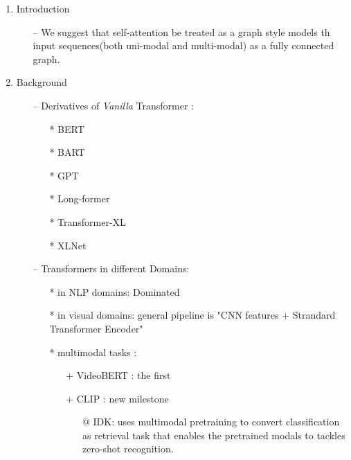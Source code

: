 \documentclass{article}
\begin{document}
	\begin{enumerate}
		\item Introduction
			\begin{itemize}
				\item[--] We suggest that self-attention be treated as a graph style models th input sequences(both uni-modal and multi-modal) as a fully connected graph.
			\end{itemize}

		\item Background
		\begin{itemize}
			\item[--] Derivatives of \textit{Vanilla} Transformer :
				\begin{itemize}
					\item[*] BERT \cite{bert}
					\item[*] BART \cite{BART}
					\item[*] GPT \cite{gpt}
					\item[*] Long-former \cite{Longformer}
					\item[*] Transformer-XL \cite{Transformer-XL}
					\item[*] XLNet \cite{XLNet}
				\end{itemize}
			\item[--] Transformers in different Domains:
				\begin{itemize}
					\item[*] in NLP domains: Dominated
					\item[*] in visual domains: general pipeline is "CNN features + Strandard Transformer Encoder" 
					\item[*] multimodal tasks :
						\begin{itemize}
							\item[+] VideoBERT : the first
							\item[+] CLIP : new milestone 
							\begin{itemize}
								\item[@] IDK: uses multimodal pretraining to convert classification as retrieval task that enables the pretrained modals to tackles zero-shot recognition.
							\end{itemize}
							

\end{itemize}
\end{itemize}
\end{itemize}
\end{enumerate}
\end{document}
